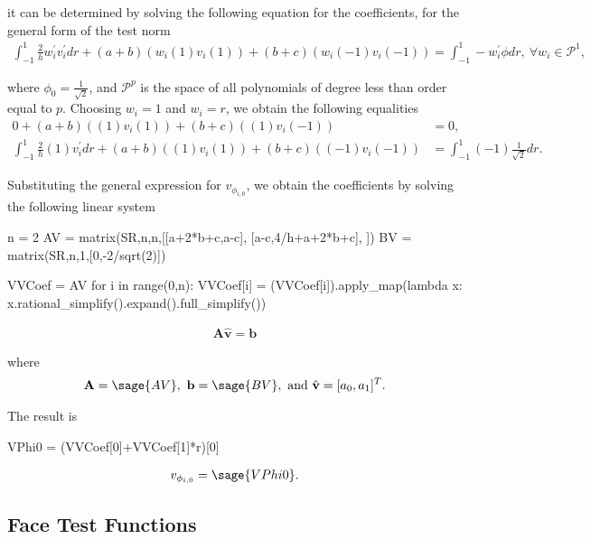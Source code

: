 \documentclass{article}
\numberwithin{equation}{section}
\newcommand{\vect}[1]{\mathbf{{#1}}}
\newcommand{\mat}[1]{\mathbf{{#1}}}
\begin{document}
it can be determined by solving the following equation for the coefficients, for the general form of the test norm
\begin{align}
\int_{-1}^{1} \frac{2}{h} w_i^{'} v_i^{'} dr + (a+b)(w_i(1)v_i(1))+(b+c)(w_i(-1)v_i(-1))
= 
\int_{-1}^{1} -w_i^{'} \phi dr,\ \forall w_i \in \mathcal{P}^1,
\end{align}

where $\phi_0 = \frac{1}{\sqrt{2}}$, and $\mathcal{P}^p$ is the space of all polynomials of degree less than order
equal to $p$. Choosing $w_i = 1$ and $w_i = r$, we obtain the following equalities
\begin{align}
0 + (a+b)((1)v_i(1))+(b+c)((1)v_i(-1)) 
& =
0, \\
\int_{-1}^{1} \frac{2}{h} (1) v_i^{'} dr + (a+b)((1)v_i(1))+(b+c)((-1)v_i(-1))
& = 
\int_{-1}^{1} (-1) \frac{1}{\sqrt{2}} dr.
\end{align}

Substituting the general expression for $v_{{\phi}_{i,0}}$, we obtain the coefficients by solving the following linear
system
\begin{sagesilent}
n = 2
AV = matrix(SR,n,n,[[a+2*b+c,a-c],
                    [a-c,4/h+a+2*b+c],
                   ])
BV = matrix(SR,n,1,[0,-2/sqrt(2)])

VVCoef = AV\BV
for i in range(0,n):
    VVCoef[i] = (VVCoef[i]).apply_map(lambda x: x.rational_simplify().expand().full_simplify())
\end{sagesilent}

\begin{align}
\mat{A} \hat{\vect{v}} = \vect{b}
\end{align}

where
\begin{align}
\mat{A} = \sage{AV},\ \vect{b} = \sage{BV},\ \text{and}\ \hat{\vect{v}} = [a_0,a_1]^T.
\end{align}

The result is
\begin{sagesilent}
VPhi0 = (VVCoef[0]+VVCoef[1]*r)[0]
\end{sagesilent}

\begin{align} \label{eq:v_opt_vol_p0}
v_{{\phi}_{i,0}} = \sage{VPhi0}.
\end{align}

\subsection{Face Test Functions}
\end{document}

